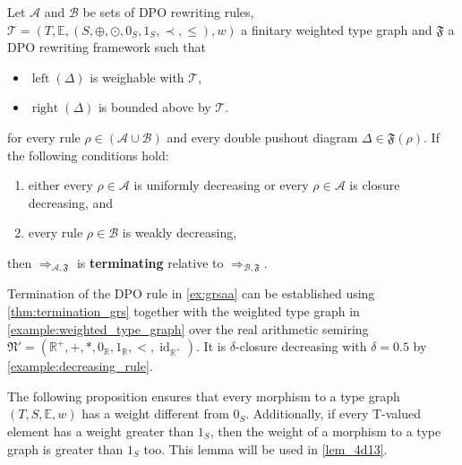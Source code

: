 \begin{theorem} 
    \label{thm:wf:termination_grs}
    Let $\mathcal{A}$ and $\mathcal{B}$ be sets of DPO rewriting rules, $\mathcal{T} = (T,\mathbb{E}, (S, \oplus, \odot, 0_S, 1_S, \prec, \leq), w)$ a finitary weighted type graph and $\mathfrak{F}$ a DPO rewriting framework such that

        \begin{itemize}
            \item \(\operatorname{left}(\Delta)\) is weighable with \(\mathcal{T}\),
            \item \(\operatorname{right}(\Delta)\) is bounded above by \(\mathcal{T}\). 
        \end{itemize}
    for every rule $\rho \in (\mathcal{A }\cup \mathcal{B })$ and every double pushout diagram  
        $\Delta \in \mathfrak{F}(\rho)$. If the following conditions hold:
    \begin{enumerate}
        \item either every $\rho \in \mathcal{A}$ is uniformly decreasing or every $\rho \in \mathcal{A}$ is closure decreasing, and
        \item every rule $\rho \in \mathcal{B}$ is weakly decreasing,
    \end{enumerate}
    then $\Rightarrow_{\mathcal{A},\mathfrak{F}}$ is \textbf{terminating} relative to $\Rightarrow_{\mathcal{B},\mathfrak{F}}$.
\end{theorem} 
\begin{example}
    \label{example:wf:termination}
    Termination of the DPO rule in \autoref{ex:grsaa} can be established using \autoref{thm:termination_grs} together with the weighted type graph in \autoref{example:weighted_type_graph} over the real arithmetic semiring $\mathfrak{N}' = (\mathbb{R}^+,+,*,0_\mathbb{R},1_\mathbb{R},<,\operatorname{id}_{\mathbb{R}^+})$. It is $\delta$-closure decreasing with $\delta = 0.5$ by \autoref{example:decreasing_rule}.
\end{example}
\newpage
\newpage
The following proposition ensures that every morphism to a type graph $(T,S,\mathbb{E}, w)$ has a weight different from $0_S$. Additionally, if every T-valued element has a weight greater than $1_S$, then the weight of a morphism to a type graph is greater than $1_S$ too. This lemma will be used in \autoref{lem_4d13}.
